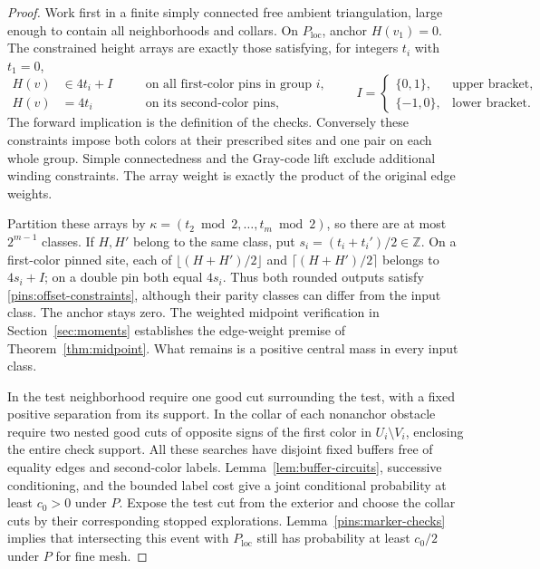 \documentclass[11pt]{article}
\newcommand{\Z}{\mathbb Z}
\theoremstyle{definition}
\theoremstyle{remark}
\numberwithin{equation}{section}
\begin{document}
\begin{proof}
Work first in a finite simply connected free ambient triangulation,
large enough to contain all neighborhoods and collars.  On
$P_{\mathrm{loc}}$, anchor $H(v_1)=0$.  The constrained height arrays
are exactly those satisfying, for integers $t_i$ with $t_1=0$,
\begin{equation}\label{pins:offset-constraints}
 \begin{aligned}
 H(v)&\in4t_i+I\quad &&\text{on all first-color pins in group }i,\\
 H(v)&=4t_i&&\text{on its second-color pins},
 \end{aligned}
 \qquad
 I=\begin{cases}\{0,1\},&\text{upper bracket},\\
                  \{-1,0\},&\text{lower bracket}.
    \end{cases}
\end{equation}
The forward implication is the definition of the checks.  Conversely
these constraints impose both colors at their prescribed sites and one
pair on each whole group.  Simple connectedness and the Gray-code lift
exclude additional winding constraints.  The array weight is exactly
the product of the original edge weights.

Partition these arrays by
$\kappa=(t_2\bmod2,\ldots,t_m\bmod2)$, so there are at most
$2^{m-1}$ classes.  If $H,H'$ belong to the same class, put
$s_i=(t_i+t_i')/2\in\Z$.  On a first-color pinned site, each of
$\lfloor(H+H')/2\rfloor$ and $\lceil(H+H')/2\rceil$ belongs to
$4s_i+I$; on a double pin both equal $4s_i$.  Thus both rounded
outputs satisfy \eqref{pins:offset-constraints}, although their parity
classes can differ from the input class.  The anchor stays zero.
The weighted midpoint verification in Section~\ref{sec:moments}
establishes the edge-weight premise of Theorem~\ref{thm:midpoint}.  What
remains is a positive central mass in every input class.

In the test neighborhood require one good cut surrounding the test,
with a fixed positive separation from its support.  In the collar of
each nonanchor obstacle require two nested good cuts of opposite signs
of the first color in $U_i\setminus V_i$, enclosing the entire check support.
All these searches have disjoint fixed buffers free of
equality edges and second-color labels.  Lemma~\ref{lem:buffer-circuits},
successive conditioning, and the bounded label cost give a joint
conditional probability at least $c_0>0$ under $P$.  Expose the test
cut from the exterior and choose the collar cuts by their corresponding
stopped explorations.  Lemma~\ref{pins:marker-checks} implies that
intersecting this event with $P_{\mathrm{loc}}$ still has probability
at least $c_0/2$ under $P$ for fine mesh.


\end{proof}
\end{document}
